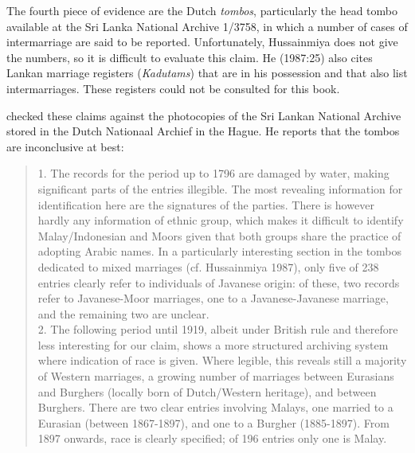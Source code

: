 The fourth piece of evidence are the Dutch \textit{tombos},  particularly the head tombo available at the Sri Lanka National Archive 1/3758, in which  a number of cases of intermarriage are said to be reported. Unfortunately, Hussainmiya does not give the numbers, so it is difficult to evaluate this claim. He (1987:25) also cites Lankan marriage registers (\textit{Kadutams}) that are in his possession and that also list intermarriages. These registers could not be consulted for this book.

\citet{Ansaldo2008genesis}  checked these claims against the photocopies of the Sri Lankan National Archive stored in the Dutch Nationaal Archief in the Hague. He reports that the tombos are inconclusive at best:
 

\begin{quote}
1. The records for the period up to 1796 are damaged by water, making significant
parts of the entries illegible. The most revealing information for identification
here are the signatures of the parties. There is however hardly any information of
ethnic group, which makes it difficult to identify Malay/Indonesian and Moors
given that both groups share the practice of adopting Arabic names. In a
particularly interesting section in the tombos dedicated to mixed marriages (cf.
Hussainmiya 1987), only five of 238 entries clearly refer to individuals of
Javanese origin: of these, two records refer to Javanese-Moor marriages, one to a
Javanese-Javanese marriage, and the remaining two are unclear.\\
2. The following period until 1919, albeit under British rule and therefore less
interesting for our claim, shows a more structured archiving system where
indication of race is given. Where legible, this reveals still a majority of Western
marriages, a growing number of marriages between Eurasians and Burghers
(locally born of Dutch/Western heritage), and between Burghers. There are two
clear entries involving Malays, one married to a Eurasian (between 1867-1897),
and one to a Burgher (1885-1897). From 1897 onwards, race is clearly specified;
of 196 entries only one is Malay. \citep{Ansaldo2008genesis}
\end{quote}

